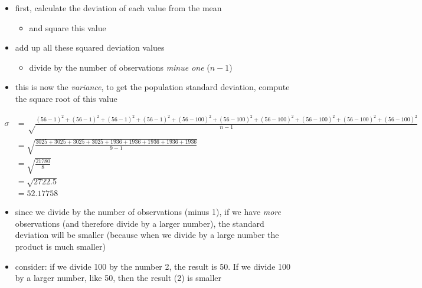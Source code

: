 \documentclass[
  letterpaper,
  DIV=11]{scrartcl}
\providecommand{\tightlist}{%
  \setlength{\itemsep}{0pt}\setlength{\parskip}{0pt}}\usepackage{longtable,booktabs,array}
\begin{document}
\begin{tcolorbox}[enhanced jigsaw, left=2mm, breakable, colframe=quarto-callout-note-color-frame, toprule=.15mm, toptitle=1mm, titlerule=0mm, leftrule=.75mm, title=\textcolor{quarto-callout-note-color}{\faInfo}\hspace{0.5em}{Calculating standard deviation}, colbacktitle=quarto-callout-note-color!10!white, colback=white, coltitle=black, arc=.35mm, bottomtitle=1mm, opacityback=0, rightrule=.15mm, bottomrule=.15mm, opacitybacktitle=0.6]

\begin{itemize}
\tightlist
\item
  first, calculate the deviation of each value from the mean

  \begin{itemize}
  \tightlist
  \item
    and square this value
  \end{itemize}
\item
  add up all these squared deviation values

  \begin{itemize}
  \tightlist
  \item
    divide by the number of observations \emph{minue one} (\(n-1\))
  \end{itemize}
\item
  this is now the \emph{variance}, to get the population standard
  deviation, compute the square root of this value
\end{itemize}

\begin{align}

\sigma & = \sqrt\frac{(56-1)^2 + (56-1)^2 + (56-1)^2 + (56-1)^2 + (56-100)^2 +
        (56-100)^2 + (56-100)^2 + (56-100)^2 + (56-100)^2 + (56-100)^2}{n-1}
\\
& = \sqrt{\frac{3025 + 3025 + 3025 + 3025 + 1936 + 1936 + 1936 + 1936 + 1936}{9-1}}
\\
& = \sqrt{\frac{21780}{8}}
\\
& = \sqrt{2722.5}
\\
& = 52.17758

\end{align}

\begin{itemize}
\item
  since we divide by the number of observations (minus 1), if we have
  \emph{more} observations (and therefore divide by a larger number),
  the standard deviation will be smaller (because when we divide by a
  large number the product is much smaller)
\item
  consider: if we divide 100 by the number 2, the result is 50. If we
  divide 100 by a larger number, like 50, then the result (2) is smaller
\end{itemize}

\end{tcolorbox}
\end{document}
